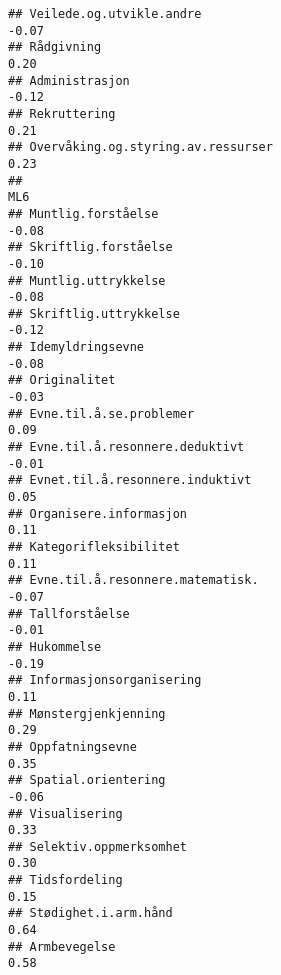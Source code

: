 \documentclass[
]{article}
\begin{document}
\begin{verbatim}
## Veilede.og.utvikle.andre                                                         -0.07
## Rådgivning                                                                        0.20
## Administrasjon                                                                   -0.12
## Rekruttering                                                                      0.21
## Overvåking.og.styring.av.ressurser                                                0.23
##                                                                                    ML6
## Muntlig.forståelse                                                               -0.08
## Skriftlig.forståelse                                                             -0.10
## Muntlig.uttrykkelse                                                              -0.08
## Skriftlig.uttrykkelse                                                            -0.12
## Idemyldringsevne                                                                 -0.08
## Originalitet                                                                     -0.03
## Evne.til.å.se.problemer                                                           0.09
## Evne.til.å.resonnere.deduktivt                                                   -0.01
## Evnet.til.å.resonnere.induktivt                                                   0.05
## Organisere.informasjon                                                            0.11
## Kategorifleksibilitet                                                             0.11
## Evne.til.å.resonnere.matematisk.                                                 -0.07
## Tallforståelse                                                                   -0.01
## Hukommelse                                                                       -0.19
## Informasjonsorganisering                                                          0.11
## Mønstergjenkjenning                                                               0.29
## Oppfatningsevne                                                                   0.35
## Spatial.orientering                                                              -0.06
## Visualisering                                                                     0.33
## Selektiv.oppmerksomhet                                                            0.30
## Tidsfordeling                                                                     0.15
## Stødighet.i.arm.hånd                                                              0.64
## Armbevegelse                                                                      0.58

\end{verbatim}
\end{document}
